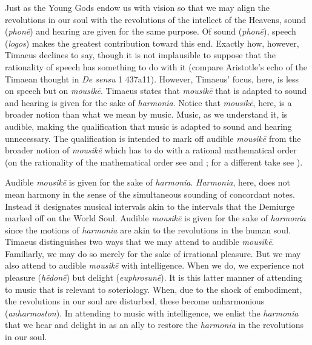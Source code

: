 Just as the Young Gods endow us with vision so that we may align the revolutions in our soul with the revolutions of the intellect of the Heavens, sound (\emph{phonē}) and hearing are given for the same purpose. Of sound (\emph{phonē}), speech (\emph{logos}) makes the greatest contribution toward this end. Exactly how, however, Timaeus declines to say, though it is not implausible to suppose that the rationality of speech has something to do with it (compare Aristotle's echo of the Timaean thought in \emph{De sensu} 1 437a11). However, Timaeus' focus, here, is less on speech but on \emph{mousikē}. Timaeus states that \emph{mousikē} that is adapted to sound and hearing is given for the sake of \emph{harmonia}. Notice that \emph{mousikē}, here, is a broader notion than what we mean by music. Music, as we understand it, is audible, making the qualification that music is adapted to sound and hearing unnecessary. The qualification is intended to mark off audible \emph{mousikē} from the broader notion of \emph{mousikē} which has to do with a rational mathematical order (on the rationality of the mathematical order see \citealt{Burnyeat:1987ix} and \citealt{Barker:1994mq}; for a different take see \citealt[295--6]{Taylor:1928qb}). 

Audible \emph{mousikē} is given for the sake of \emph{harmonia}. \emph{Harmonia}, here, does not mean harmony in the sense of the simultaneous sounding of concordant notes. Instead it designates musical intervals akin to the intervals that the Demiurge marked off on the World Soul. Audible \emph{mousikē} is given for the sake of \emph{harmonia} since the motions of \emph{harmonia} are akin to the revolutions in the human soul. Timaeus distinguishes two ways that we may attend to audible \emph{mousikē}. Familiarly, we may do so merely for the sake of irrational pleasure. But we may also attend to audible \emph{mousikē} with intelligence. When we do, we experience not pleasure (\emph{hēdonē}) but delight (\emph{euphrosunē}). It is this latter manner of attending to music that is relevant to soteriology. When, due to the shock of embodiment, the revolutions in our soul are disturbed, these become unharmonious (\emph{anharmoston}). In attending to music with intelligence, we enlist the \emph{harmonia} that we hear and delight in as an ally to restore the \emph{harmonia} in the revolutions in our soul.

